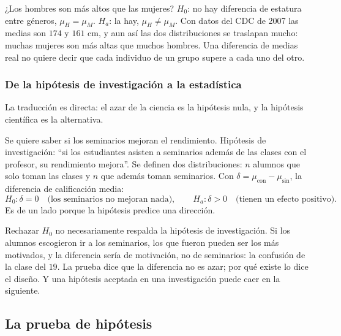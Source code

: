 \documentclass[11pt,letterpaper]{article}
\begin{document}
\begin{ejemplo}[Estatura]
    ¿Los hombres son más altos que las mujeres? $H_0$: no hay diferencia
    de estatura entre géneros, $\mu_H = \mu_M$. $H_a$: la hay,
    $\mu_H \neq \mu_M$. Con datos del CDC de 2007 las medias son
    $174$ y $161$ cm, y aun así las dos distribuciones se traslapan
    mucho: muchas mujeres son más altas que muchos hombres. Una
    diferencia de medias real no quiere decir que cada individuo de un
    grupo supere a cada uno del otro.
\end{ejemplo}

\subsubsection*{De la hipótesis de investigación a la estadística}

La traducción es directa: el azar de la ciencia es la hipótesis nula, y
la hipótesis científica es la alternativa.

\begin{ejemplo}[Seminarios]
    Se quiere saber si los seminarios mejoran el rendimiento.
    Hipótesis de investigación: ``si los estudiantes asisten a
    seminarios además de las clases con el profesor, su rendimiento
    mejora''. Se definen dos distribuciones: $n$ alumnos que solo toman
    las clases y $n$ que además toman seminarios. Con
    $\delta = \mu_{\text{con}} - \mu_{\text{sin}}$, la diferencia de
    calificación media:
    \[
        H_0\colon \delta = 0
        \quad \text{(los seminarios no mejoran nada)} ,
        \qquad
        H_a\colon \delta > 0
        \quad \text{(tienen un efecto positivo)} .
    \]
    Es de un lado porque la hipótesis predice una dirección.
\end{ejemplo}

\begin{ojo}
    Rechazar $H_0$ no necesariamente respalda la hipótesis de
    investigación. Si los alumnos escogieron ir a los seminarios,
    los que fueron pueden ser los más motivados, y la diferencia sería
    de motivación, no de seminarios: la confusión de la clase del $19$.
    La prueba dice que la diferencia no es azar; por qué existe lo dice
    el diseño. Y una hipótesis aceptada en una investigación puede caer
    en la siguiente.
\end{ojo}


\subsection*{La prueba de hipótesis}
\end{document}

